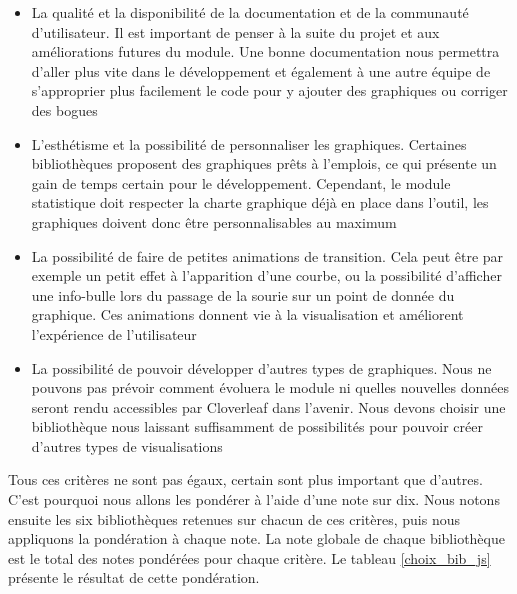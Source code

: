 			\begin{itemize}
			  \item La qualité et la disponibilité de la documentation et de la
			  communauté d'utilisateur. Il est important de penser à la suite du projet
			  et aux améliorations futures du module. Une bonne documentation nous
			  permettra d'aller plus vite dans le développement et également à une autre
			  équipe de s'approprier plus facilement le code pour y
			  ajouter des graphiques ou corriger des bogues
			  \item L'esthétisme et la possibilité de personnaliser les graphiques.
			  Certaines bibliothèques proposent des graphiques prêts à l'emplois, ce qui
			  présente un gain de temps certain pour le développement. Cependant, le module
			  statistique doit respecter la charte graphique déjà en place dans l'outil,
			  les graphiques doivent donc être personnalisables au maximum
			  \item La possibilité de faire de petites animations de transition. Cela
			  peut être par exemple un petit effet à l'apparition d'une courbe, ou la
			  possibilité d'afficher une info-bulle lors du passage de la sourie sur un
			  point de donnée du graphique. Ces animations donnent vie à la visualisation
			  et améliorent l'expérience de l'utilisateur
			  \item La possibilité de pouvoir développer d'autres types de graphiques.
			  Nous ne pouvons pas prévoir comment évoluera le module ni quelles nouvelles
			  données seront rendu accessibles par Cloverleaf dans l'avenir. Nous devons
			  choisir une bibliothèque nous laissant suffisamment de possibilités pour
			  pouvoir créer d'autres types de visualisations
			\end{itemize}
			Tous ces critères ne sont pas égaux, certain sont plus important que
			d'autres. C'est pourquoi nous allons les pondérer à l'aide d'une note sur
			dix. Nous notons ensuite les six bibliothèques retenues sur chacun de ces
			critères, puis nous appliquons la pondération à chaque note. La note globale
			de chaque bibliothèque est le total des notes pondérées pour chaque critère.
			Le tableau \ref{choix_bib_js} présente le résultat de cette pondération.
